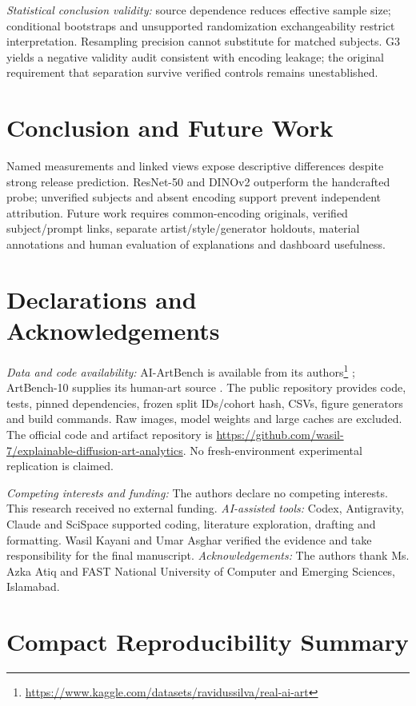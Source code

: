 \documentclass[journal,twoside,web]{IEEEtran}
\begin{document}
\textit{Statistical conclusion validity:} source dependence reduces effective sample size; conditional bootstraps and unsupported randomization exchangeability restrict interpretation. Resampling precision cannot substitute for matched subjects. G3 yields a negative validity audit consistent with encoding leakage; the original requirement that separation survive verified controls remains unestablished.

\section{Conclusion and Future Work}
Named measurements and linked views expose descriptive differences despite strong release prediction. ResNet-50 and DINOv2 outperform the handcrafted probe; unverified subjects and absent encoding support prevent independent attribution. Future work requires common-encoding originals, verified subject/prompt links, separate artist/style/generator holdouts, material annotations and human evaluation of explanations and dashboard usefulness.

\section{Declarations and Acknowledgements}
\textit{Data and code availability:} AI-ArtBench is available from its authors\footnote{\url{https://www.kaggle.com/datasets/ravidussilva/real-ai-art}} \cite{p1}; ArtBench-10 supplies its human-art source \cite{artbench}. The public repository provides code, tests, pinned dependencies, frozen split IDs/cohort hash, CSVs, figure generators and build commands. Raw images, model weights and large caches are excluded. The official code and artifact repository is \url{https://github.com/wasil-7/explainable-diffusion-art-analytics}. No fresh-environment experimental replication is claimed.

\textit{Competing interests and funding:} The authors declare no competing interests. This research received no external funding. \textit{AI-assisted tools:} Codex, Antigravity, Claude and SciSpace supported coding, literature exploration, drafting and formatting. Wasil Kayani and Umar Asghar verified the evidence and take responsibility for the final manuscript. \textit{Acknowledgements:} The authors thank Ms. Azka Atiq and FAST National University of Computer and Emerging Sciences, Islamabad.



\appendices
\section{Compact Reproducibility Summary}
{\footnotesize}
\end{document}
